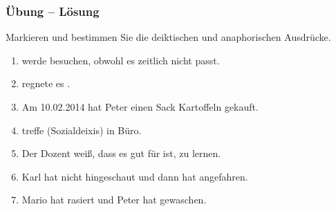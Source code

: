 
\begin{frame}
\frametitle{Übung -- Lösung}

Markieren und bestimmen Sie die deiktischen und anaphorischen Ausdrücke.
	
	\begin{enumerate}
		\item {}  werde     besuchen, obwohl es   zeitlich nicht passt.
		\item {}  regnete es  .
		\item Am 10.02.2014 hat Peter einen Sack Kartoffeln gekauft.
		\item {}  treffe  (Sozialdeixis) in   Büro.
		\item Der Dozent wei\ss{}, dass es gut für   ist,   zu lernen.
		\item Karl hat nicht hingeschaut und dann hat     angefahren.
		\item Mario hat   rasiert und Peter hat   gewaschen.
	\end{enumerate}     

\end{frame}